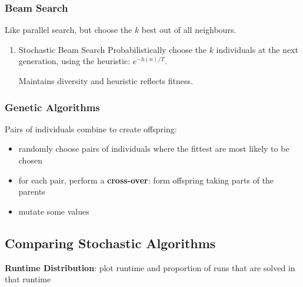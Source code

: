 \documentclass[11pt]{article}
\begin{document}
\subsubsection{Beam Search}
\label{sec:orgdae1d54}
Like parallel search, but choose the \(k\) best out of all neighbours.
\begin{enumerate}
\item Stochastic Beam Search
\label{sec:org21c670c}
Probabilistically choose the \(k\) individuals at the next generation, using the heuristic:
\(e^{-h(n)/T}\).

Maintains diversity and heuristic reflects fitness.
\end{enumerate}
\subsubsection{Genetic Algorithms}
\label{sec:org25f0377}
Pairs of individuals combine to create offspring:
\begin{itemize}
\item randomly choose pairs of individuals where the fittest are most likely to be chosen
\item for each pair, perform a \textbf{cross-over}: form offspring taking parts of the parents
\item mutate some values
\end{itemize}
\subsection{Comparing Stochastic Algorithms}
\label{sec:org6bdea17}
\textbf{Runtime Distribution}: plot runtime and proportion of runs that are solved in that runtime
\end{document}

